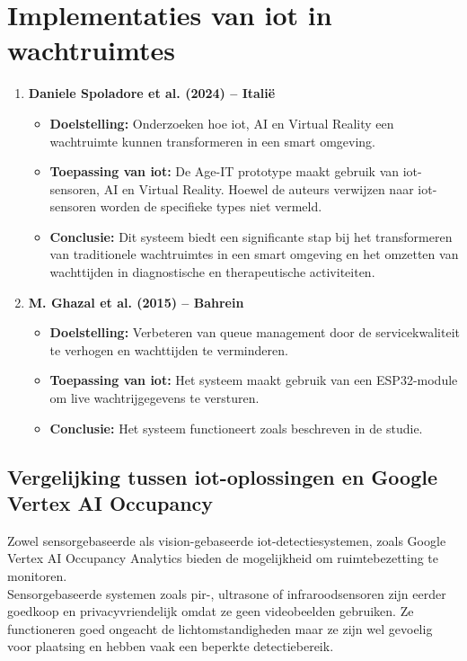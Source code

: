 \section{Implementaties van \gls{iot} in wachtruimtes}
\begin{enumerate}
    \item \textbf{Daniele Spoladore et al. (2024) – Italië} \autocite{Spoladore2024}
    \begin{itemize}
        \item \textbf{Doelstelling:} Onderzoeken hoe \gls{iot}, AI en Virtual Reality een wachtruimte kunnen transformeren in een smart omgeving.
        \item \textbf{Toepassing van \gls{iot}:} De Age-IT prototype maakt gebruik van \gls{iot}-sensoren, AI en Virtual Reality. Hoewel de auteurs verwijzen naar \gls{iot}-sensoren worden de specifieke types niet vermeld.
        \item \textbf{Conclusie:} Dit systeem biedt een significante stap bij het transformeren van traditionele wachtruimtes in een smart omgeving en het omzetten van wachttijden in diagnostische en therapeutische activiteiten.
    \end{itemize}
    
    \item \textbf{M. Ghazal et al. (2015) – Bahrein} \autocite{Ghazal2015}
    \begin{itemize}
        \item \textbf{Doelstelling:} Verbeteren van queue management door de servicekwaliteit te verhogen en wachttijden te verminderen.
        \item \textbf{Toepassing van \gls{iot}:} Het systeem maakt gebruik van een ESP32-module om live wachtrijgegevens te versturen.
        \item \textbf{Conclusie:} Het systeem functioneert zoals beschreven in de studie.
    \end{itemize}
\end{enumerate} 

\subsection{Vergelijking tussen \gls{iot}-oplossingen en Google Vertex AI Occupancy}
Zowel sensorgebaseerde als vision-gebaseerde \gls{iot}-detectiesystemen, zoals Google Vertex AI Occupancy Analytics bieden de mogelijkheid om ruimtebezetting te monitoren. \\

Sensorgebaseerde systemen zoals \gls{pir}-, ultrasone of infraroodsensoren zijn eerder goedkoop en privacyvriendelijk omdat ze geen videobeelden gebruiken. Ze functioneren goed ongeacht de lichtomstandigheden maar ze zijn wel gevoelig voor plaatsing en hebben vaak een beperkte detectiebereik. \\

